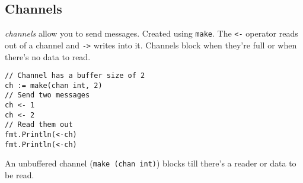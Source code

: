 \subsection{Channels}
\textit{channels} allow you to send messages. Created using \texttt{make}.
The \texttt{<-} operator reads out of a channel and \texttt{->} writes into it.
Channels block when they're full or when there's no data to read.
\begin{lstlisting}
// Channel has a buffer size of 2
ch := make(chan int, 2)
// Send two messages
ch <- 1
ch <- 2
// Read them out
fmt.Println(<-ch)
fmt.Println(<-ch)
\end{lstlisting}

An unbuffered channel (\texttt{make (chan int)}) blocks till there's a reader or data to be read.

